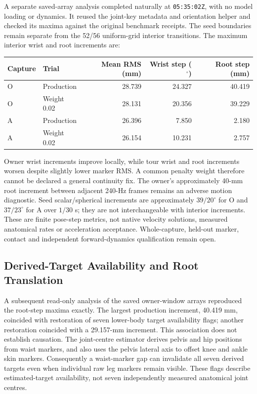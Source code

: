 \documentclass[11pt,a4paper]{article}
\begin{document}
A separate saved-array analysis completed naturally at
\texttt{05:35:02Z}, with no model loading or dynamics. It reused the joint-key
metadata and orientation helper and checked its maxima against the original
benchmark receipts. The seed boundaries remain separate from the 52/56
uniform-grid interior transitions. The maximum interior wrist and root
increments are:
\begin{center}
\begin{tabular}{llrrr}
\hline
Capture & Trial & Mean RMS (mm) & Wrist step ($^{\circ}$) & Root step (mm)\\
\hline
O & Production & 28.739 & 24.327 & 40.419\\
O & Weight 0.02 & 28.131 & 20.356 & 39.229\\
A & Production & 26.396 & 7.850 & 2.180\\
A & Weight 0.02 & 26.154 & 10.231 & 2.757\\
\hline
\end{tabular}
\end{center}
Owner wrist increments improve locally, while tour wrist and root increments
worsen despite slightly lower marker RMS. A common penalty weight therefore
cannot be declared a general continuity fix. The owner's approximately
40-mm root increment between adjacent 240-Hz frames remains an adverse
motion diagnostic. Seed scalar/spherical increments are approximately
$39/20^{\circ}$ for O and $37/23^{\circ}$ for A over $1/30$ s; they are
not interchangeable with interior increments. These are finite pose-step
metrics, not native velocity solutions, measured anatomical rates or
acceleration acceptance. Whole-capture, held-out marker, contact and
independent forward-dynamics qualification remain open.

\subsection{Derived-Target Availability and Root Translation}
A subsequent read-only analysis of the saved owner-window arrays reproduced
the root-step maxima exactly. The largest production increment, 40.419 mm,
coincided with restoration of seven lower-body target availability flags;
another restoration coincided with a 29.157-mm increment. This association
does not establish causation. The joint-centre estimator derives pelvis and
hip positions from waist markers, and also uses the pelvis lateral axis to
offset knee and ankle skin markers. Consequently a waist-marker gap can
invalidate all seven derived targets even when individual raw leg markers
remain visible. These flags describe estimated-target availability, not
seven independently measured anatomical joint centres.
\end{document}
